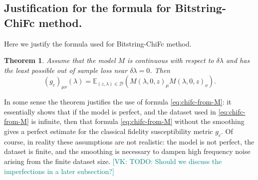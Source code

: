 \documentclass[american,aps,pra,reprint,floatfix,nofootinbib,superscriptaddress]{revtex4-2}
\newtheorem{theorem}{Theorem}
\newcommand{\VK}[1]{\textcolor{teal}{[VK: #1]}}
\begin{document}
\subsection{Justification for the formula for Bitstring-ChiFc method.}
Here we justify the formula used for Bitstring-ChiFc
method.
\begin{theorem}
    Assume that the model $M$ is continuous with respect to
    $\delta \lambda$ and
    has the least possible out of sample loss
    near $\delta \lambda = 0$.
    Then
    \begin{equation}
      \label{eq:chifc-from-M-perfect}
      \left(g_{c}\right)_{\mu\nu}(\lambda) =
        \mathbb{E}_{(z, \lambda) \in \mathcal{D}}
        \left(
          M(\lambda, 0, z)_{\mu}M(\lambda, 0, z)_{\nu}
        \right).
    \end{equation}
\end{theorem}
In some sense the theorem justifies the use of formula
\eqref{eq:chifc-from-M}: it essentially shows that if the model
is perfect, and the dataset used in \eqref{eq:chifc-from-M} is
infinite, then that formula \eqref{eq:chifc-from-M} without the
smoothing gives a perfect estimate for the classical fidelity
susceptibility metric $g_c$. Of course, in reality these assumptions are not realistic: the model is not perfect, the dataset is finite, and the smoothing is necessary to dampen high frequency noise arising from the finite dataset size.
\VK{TODO: Should we discuss the imperfections
in a later subsection?}
\end{document}

